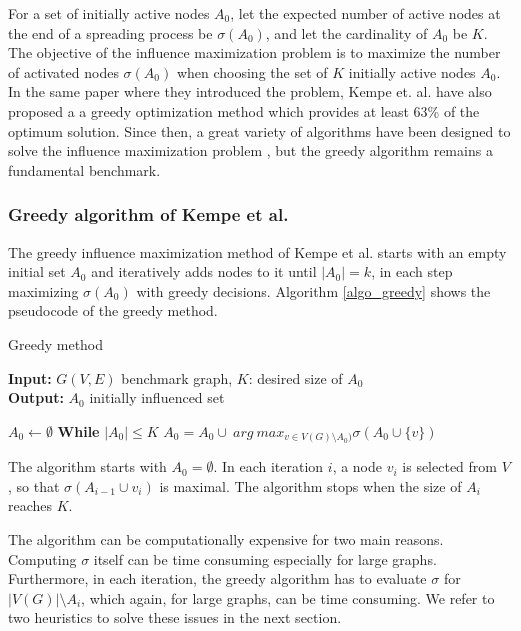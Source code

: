 \documentclass[pdflatex,sn-mathphys-num]{sn-jnl}
\begin{document}
For a set of initially active nodes $A_0$, let the expected number of active nodes at the end of a spreading process be $\sigma(A_0)$, and let the cardinality of $A_0$ be $K$. The objective of the influence maximization problem is to maximize the number of activated nodes $\sigma(A_0)$ when choosing the set of $K$ initially active nodes $A_0$. In the same paper where they introduced the problem, Kempe et. al. have also proposed a a greedy optimization method which provides at least 63\% of the optimum solution. Since then, a great variety of algorithms have been designed to solve the influence maximization problem \cite{lisurvey}, but the greedy algorithm remains a fundamental benchmark.



\subsubsection{Greedy algorithm of Kempe et al.}\label{subsec_greedy}

The greedy influence maximization method of Kempe et al. \cite{kempe} starts with an empty initial set $A_0$ and iteratively adds nodes to it until $|A_0| = k$, in each step maximizing $\sigma(A_0)$ with greedy decisions. Algorithm \ref{algo_greedy} shows the pseudocode of the greedy method.

\begin{algorithm}[ht]
\caption{Greedy method}
\label{algo_greedy}
\textbf{Input:} $G(V,E)$ benchmark graph, $K$: desired size of $A_0$
\\
\textbf{Output:} $A_{0}$ initially influenced set
\begin{algorithmic}[1]
    \State $A_0 \leftarrow \emptyset$
    \State \textbf{While} $|A_{0}| \leq K$
    \State \hspace{\algorithmicindent} $A_{0}=A_{0} \cup \ arg \ max_{v \in V(G) \setminus A_{0})} \sigma(A_{0} \cup \{v\})$
\end{algorithmic}
\end{algorithm}

The algorithm starts with $A_0 = \emptyset$. In each iteration $i$, a node $v_i$ is selected from $V$, so that $\sigma(A_{i-1} \cup {v_i})$ is maximal. The algorithm stops when the size of $A_i$ reaches $K$.

The algorithm can be computationally expensive for two main reasons. Computing $\sigma$ itself can be time consuming especially for large graphs. Furthermore, in each iteration, the greedy algorithm has to evaluate $\sigma$ for $|V(G)| \setminus A_i$, which again, for large graphs, can be time consuming. We refer to two heuristics to solve these issues in the next section.
\end{document}
